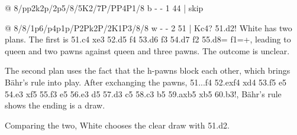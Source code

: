 @ 8/pp2k2p/2p5/8/5K2/7P/PP4P1/8 b - - 1 44 | skip

@ 8/8/1p6/p4p1p/P2Pk2P/2K1P3/8/8 w - - 2 51 | Kc4?
51.\K d2! White has two plans. The first is 51.\K c4 \K xe3 52.d5 f4 53.d6 f3 54.d7 f2 55.d8=\Q{} f1=\Q{}+, leading to queen and two pawns against queen and three pawns. The outcome is unclear.

The second plan uses the fact that the h-pawns block each other, which brings Bähr's rule into play. After exchanging the pawns, 51...f4 52.exf4 \K xd4 53.f5 \K e5 54.\K e3 \K xf5 55.\K f3 \K e5 56.\K e3 \K d5 57.\K d3 \K c5 58.\K c3 b5 59.axb5 \K xb5 60.\K b3!, Bähr's rule shows the ending is a draw.

Comparing the two, White chooses the clear draw with 51.\K d2.
